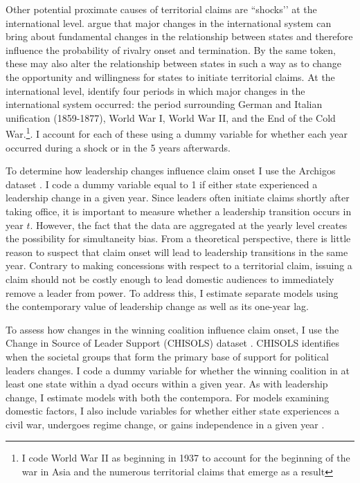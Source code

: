 Other potential proximate causes of territorial claims are ``shocks’’ at the international level. \citet{goertz1995} argue that major changes in the international system can bring about fundamental changes in the relationship between states and therefore influence the probability of rivalry onset and termination. By the same token, these may also alter the relationship between states in such a way as to change the opportunity and willingness for states to initiate territorial claims. At the international level, \citet{goertz2005} identify four periods in which major changes in the international system occurred: the period surrounding German and Italian unification (1859-1877), World War I, World War II, and the End of the Cold War.\footnote{I code World War II as beginning in 1937 to account for the beginning of the war in Asia and the numerous territorial claims that emerge as a result}. I account for each of these using a dummy variable for whether each year occurred during a shock or in the 5 years afterwards. 




To determine how leadership changes influence claim onset I use the Archigos dataset \citep{goemans2009}. I code a dummy variable equal to 1 if either state experienced a leadership change in a given year. Since leaders often initiate claims shortly after taking office, it is important to measure whether a leadership transition occurs in year $t$. However, the fact that the data are aggregated at the yearly level creates the possibility for simultaneity bias. From a theoretical perspective, there is little reason to suspect that claim onset will lead to leadership transitions in the same year. Contrary to making concessions with respect to a territorial claim, issuing a claim should not be costly enough to lead domestic audiences to immediately remove a leader from power. To address this, I estimate separate models using the contemporary value of leadership change as well as its one-year lag.


To assess how changes in the winning coalition influence claim onset, I use the Change in Source of Leader Support (CHISOLS) dataset \citep{mattes2016}. CHISOLS identifies when the societal groups that form the primary base of support for political leaders changes. I code a dummy variable for whether the winning coalition in at least one state within a dyad occurs within a given year. As with leadership change, I estimate models with both the contempora. For models examining domestic factors, I also include variables for whether either state experiences a civil war, undergoes regime change, or gains independence in a given year \citep{ cow2017, gleditsch2002a, goertz1995, marshall2013, mattes2016}.

